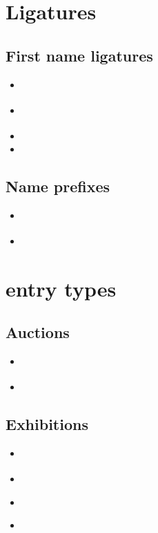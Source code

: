 \documentclass[a4paper,12pt,twoside]{scrartcl}
\begin{document}
\section{Ligatures}

\subsection{First name ligatures}
\begin{itemize}
    \item\cite{test::firstnames::2}%
    \item\cite{test::firstnames::1}%
    \item{}%
    \item{}%
\end{itemize}

\subsection{Name prefixes}
\begin{itemize}
    \item\cite{test::prefixnames::1}%
    \item{}%
\end{itemize}

\section{entry types}

\subsection{Auctions}
\begin{itemize}
    \item\cite{hesse:c:1995}%
    \item{}
\end{itemize}

\subsection{Exhibitions}
\begin{itemize}
    \item\cite{schaedler:1999}%
    \item{}%
    \item\cite{oberlechner:1999}%
    \item{}%
\end{itemize}
\end{document}
